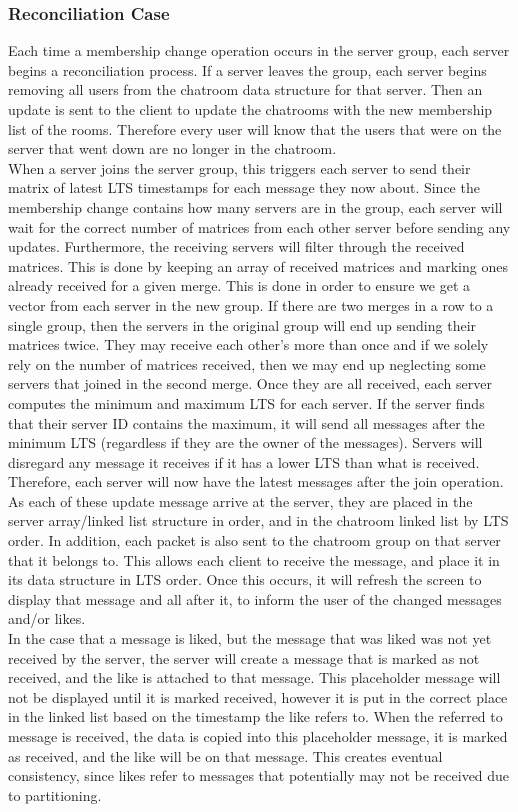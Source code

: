 \documentclass[12pt,journal,compsoc]{IEEEtran}
\begin{document}
\subsubsection{Reconciliation Case}
Each time a membership change operation occurs in the server group, each
server begins a reconciliation process.  If a server leaves the group, each server begins removing all users from the chatroom data structure for that
server.  Then an update is sent to the client to update the
chatrooms with the new membership list of the rooms.  Therefore every user
will know that the users that were on the server that went down are no
longer in the chatroom.  \\When a server joins the server group, this triggers
each server to send their matrix of latest LTS timestamps for each message
they now about.  Since the membership change contains how many servers are
in the group, each server will wait for the correct number of matrices from
each other server before sending any updates. Furthermore, the receiving
servers will filter through the received matrices. This is done by keeping
an array of received matrices and marking ones already received for a given
merge.  This is done in order to ensure we get a vector from each server in the new group. If there are two merges in a row to a single
group, then the servers in the original group will end up sending their
matrices twice. They may receive each other's more than once and if we
solely rely on the number of matrices received, then we may end up
neglecting some servers that joined in the second merge.  Once they are all received, each server computes the minimum and maximum LTS for each server.  If the server finds that their server ID contains the maximum, it will send all messages after the minimum LTS (regardless if they are the owner of the messages).  Servers will disregard any message it receives if it has a lower LTS than what is received.  Therefore, each server will now have the latest messages after the join operation.  \\
As each of these update message arrive at the server, they are placed in the server array/linked list structure in order, and in the chatroom linked list by LTS order.  In addition, each packet is also sent to the chatroom group on that server that it belongs to.  This allows each client to receive the message, and place it in its data structure in LTS order.  Once this occurs, it will refresh the screen to display that message and all after it, to inform the user of the changed messages and/or likes.\\
In the case that a message is liked, but the message that was liked was not yet received by the server, the server will create a message that is marked as not received, and the like is attached to that message.  This placeholder message will not be displayed until it is marked received, however it is put in the correct place in the linked list based on the timestamp the like refers to.  When the referred to message is received, the data is copied into this placeholder message, it is marked as received, and the like will be on that message.  This creates eventual consistency, since likes refer to messages that potentially may not be received due to partitioning.
\end{document}
